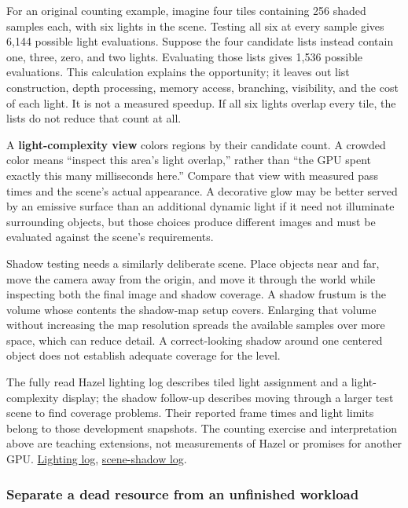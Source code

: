 For an original counting example, imagine four tiles containing 256 shaded samples each, with six lights in the scene. Testing all six at every sample gives 6,144 possible light evaluations. Suppose the four candidate lists instead contain one, three, zero, and two lights. Evaluating those lists gives 1,536 possible evaluations. This calculation explains the opportunity; it leaves out list construction, depth processing, memory access, branching, visibility, and the cost of each light. It is not a measured speedup. If all six lights overlap every tile, the lists do not reduce that count at all.

A \textbf{light-complexity view} colors regions by their candidate count. A crowded color means ``inspect this area's light overlap,'' rather than ``the GPU spent exactly this many milliseconds here.'' Compare that view with measured pass times and the scene's actual appearance. A decorative glow may be better served by an emissive surface than an additional dynamic light if it need not illuminate surrounding objects, but those choices produce different images and must be evaluated against the scene's requirements.

Shadow testing needs a similarly deliberate scene. Place objects near and far, move the camera away from the origin, and move it through the world while inspecting both the final image and shadow coverage. A shadow frustum is the volume whose contents the shadow-map setup covers. Enlarging that volume without increasing the map resolution spreads the available samples over more space, which can reduce detail. A correct-looking shadow around one centered object does not establish adequate coverage for the level.

The fully read Hazel lighting log describes tiled light assignment and a light-complexity display; the shadow follow-up describes moving through a larger test scene to find coverage problems. Their reported frame times and light limits belong to those development snapshots. The counting exercise and interpretation above are teaching extensions, not measurements of Hazel or promises for another GPU. \href{https://www.youtube.com/watch?v=e0YTiO0Ur4o}{Lighting log}, \href{https://www.youtube.com/watch?v=16zctOwxGXM}{scene-shadow log}.

\subsubsection{Separate a dead resource from an unfinished workload}\label{06-engine-ii-ch026-separate-a-dead-resource-from-an-unfinished-workload}

